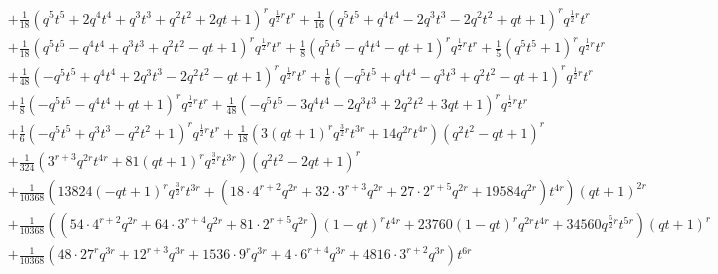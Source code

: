 \documentclass[11pt,english]{amsart}
\numberwithin{equation}{section}
\numberwithin{figure}{section}
\theoremstyle{plain}
\theoremstyle{plain}
\theoremstyle{definition}
\theoremstyle{remark}
\begin{document}
{\begin{align*}
 & + \frac{1}{18}  {\left(q^{5} t^{5} + 2  q^{4} t^{4} + q^{3} t^{3} + q^{2} t^{2} + 2  q t + 1\right)}^{r} q^{\frac{1}{2}  r} t^{r} + \frac{1}{16}  {\left(q^{5} t^{5} + q^{4} t^{4} - 2  q^{3} t^{3} - 2  q^{2} t^{2} + q t + 1\right)}^{r} q^{\frac{1}{2}  r} t^{r} \\
 & + \frac{1}{18}  {\left(q^{5} t^{5} - q^{4} t^{4} + q^{3} t^{3} + q^{2} t^{2} - q t + 1\right)}^{r} q^{\frac{1}{2}  r} t^{r} + \frac{1}{8}  {\left(q^{5} t^{5} - q^{4} t^{4} - q t + 1\right)}^{r} q^{\frac{1}{2}  r} t^{r} + \frac{1}{5}  {\left(q^{5} t^{5} + 1\right)}^{r} q^{\frac{1}{2}  r} t^{r} \\
 & + \frac{1}{48}  {\left(-q^{5} t^{5} + q^{4} t^{4} + 2  q^{3} t^{3} - 2  q^{2} t^{2} - q t + 1\right)}^{r} q^{\frac{1}{2}  r} t^{r} + \frac{1}{6}  {\left(-q^{5} t^{5} + q^{4} t^{4} - q^{3} t^{3} + q^{2} t^{2} - q t + 1\right)}^{r} q^{\frac{1}{2}  r} t^{r} \\
 & + \frac{1}{8}  {\left(-q^{5} t^{5} - q^{4} t^{4} + q t + 1\right)}^{r} q^{\frac{1}{2}  r} t^{r} + \frac{1}{48}  {\left(-q^{5} t^{5} - 3  q^{4} t^{4} - 2  q^{3} t^{3} + 2  q^{2} t^{2} + 3  q t + 1\right)}^{r} q^{\frac{1}{2}  r} t^{r} \\
 & + \frac{1}{6}  {\left(-q^{5} t^{5} + q^{3} t^{3} - q^{2} t^{2} + 1\right)}^{r} q^{\frac{1}{2}  r} t^{r} + \frac{1}{18}  {\left(3  {\left(q t + 1\right)}^{r} q^{\frac{3}{2}  r} t^{3  r} + 14  q^{2  r} t^{4  r}\right)} {\left(q^{2} t^{2} - q t + 1\right)}^{r} \\
 & + \frac{1}{324}  {\left(3^{r + 3} q^{2  r} t^{4  r} + 81  {\left(q t + 1\right)}^{r} q^{\frac{3}{2}  r} t^{3  r}\right)} {\left(q^{2} t^{2} - 2  q t + 1\right)}^{r} \\
 & + \frac{1}{10368}  {\left(13824  {\left(-q t + 1\right)}^{r} q^{\frac{3}{2}  r} t^{3  r} + {\left(18 \cdot 4^{r + 2} q^{2  r} + 32 \cdot 3^{r + 3} q^{2  r} + 27 \cdot 2^{r + 5} q^{2  r} + 19584  q^{2  r}\right)} t^{4  r}\right)} {\left(q t + 1\right)}^{2  r} \\
 & + \frac{1}{10368}  {\left({\left(54 \cdot 4^{r + 2} q^{2  r} + 64 \cdot 3^{r + 4} q^{2  r} + 81 \cdot 2^{r + 5} q^{2  r}\right)} {\left(1-q t\right)}^{r} t^{4  r} + 23760  {\left(1-q t\right)}^{r} q^{2  r} t^{4  r} + 34560  q^{\frac{5}{2}  r} t^{5  r}\right)} {\left(q t + 1\right)}^{r} \\
 & + \frac{1}{10368}  {\left(48 \cdot 27^{r} q^{3  r} + 12^{r + 3} q^{3  r} + 1536 \cdot 9^{r} q^{3  r} + 4 \cdot 6^{r + 4} q^{3  r} + 4816 \cdot 3^{r + 2} q^{3  r}\right)} t^{6  r} \\

\end{align*}}
\end{document}
